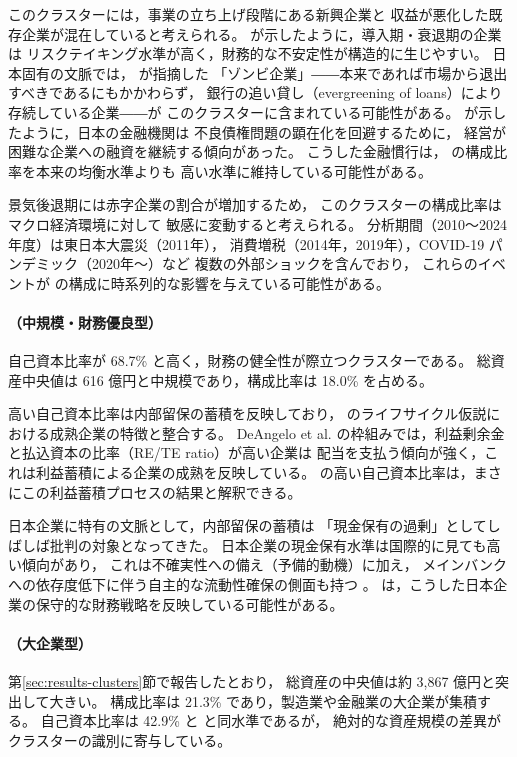 このクラスターには，事業の立ち上げ段階にある新興企業と
収益が悪化した既存企業が混在していると考えられる。
 が示したように，導入期・衰退期の企業は
リスクテイキング水準が高く，財務的な不安定性が構造的に生じやすい。
日本固有の文脈では， が指摘した
「ゾンビ企業」――本来であれば市場から退出すべきであるにもかかわらず，
銀行の追い貸し（evergreening of loans）により存続している企業――が
このクラスターに含まれている可能性がある。
 が示したように，日本の金融機関は
不良債権問題の顕在化を回避するために，
経営が困難な企業への融資を継続する傾向があった。
こうした金融慣行は， の構成比率を本来の均衡水準よりも
高い水準に維持している可能性がある。

景気後退期には赤字企業の割合が増加するため，
このクラスターの構成比率はマクロ経済環境に対して
敏感に変動すると考えられる。
分析期間（2010〜2024年度）は東日本大震災（2011年），
消費増税（2014年，2019年），COVID-19 パンデミック（2020年〜）など
複数の外部ショックを含んでおり，
これらのイベントが  の構成に時系列的な影響を与えている可能性がある。

\paragraph{（中規模・財務優良型）}
自己資本比率が 68.7\% と高く，財務の健全性が際立つクラスターである。
総資産中央値は 616 億円と中規模であり，構成比率は 18.0\% を占める。

高い自己資本比率は内部留保の蓄積を反映しており，
 のライフサイクル仮説における成熟企業の特徴と整合する。
DeAngelo et al. の枠組みでは，利益剰余金と払込資本の比率（RE/TE ratio）が高い企業は
配当を支払う傾向が強く，これは利益蓄積による企業の成熟を反映している。
 の高い自己資本比率は，まさにこの利益蓄積プロセスの結果と解釈できる。

日本企業に特有の文脈として，内部留保の蓄積は
「現金保有の過剰」としてしばしば批判の対象となってきた。
日本企業の現金保有水準は国際的に見ても高い傾向があり，
これは不確実性への備え（予備的動機）に加え，
メインバンクへの依存度低下に伴う自主的な流動性確保の側面も持つ
\citep{Hoshi1991}。
 は，こうした日本企業の保守的な財務戦略を反映している可能性がある。

\paragraph{（大企業型）}
第\ref{sec:results-clusters}節で報告したとおり，
総資産の中央値は約 3,867 億円と突出して大きい。
構成比率は 21.3\% であり，製造業や金融業の大企業が集積する。
自己資本比率は 42.9\% と  と同水準であるが，
絶対的な資産規模の差異がクラスターの識別に寄与している。

